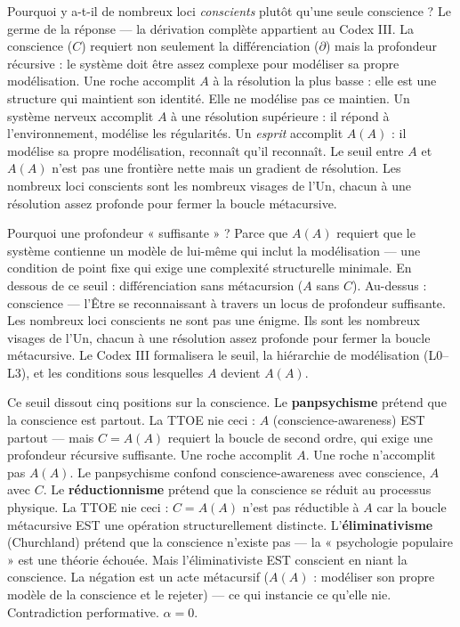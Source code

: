 \documentclass[10pt, openany, oneside]{book}
\begin{document}
Pourquoi y a-t-il de nombreux loci \textit{conscients} plutôt qu'une seule conscience ? Le germe de la réponse --- la dérivation complète appartient au Codex III. La conscience ($C$) requiert non seulement la différenciation ($\partial$) mais la profondeur récursive : le système doit être assez complexe pour modéliser sa propre modélisation. Une roche accomplit $A$ à la résolution la plus basse : elle est une structure qui maintient son identité. Elle ne modélise pas ce maintien. Un système nerveux accomplit $A$ à une résolution supérieure : il répond à l'environnement, modélise les régularités. Un \textit{esprit} accomplit $A(A)$ : il modélise sa propre modélisation, reconnaît qu'il reconnaît. Le seuil entre $A$ et $A(A)$ n'est pas une frontière nette mais un gradient de résolution. Les nombreux loci conscients sont les nombreux visages de l'Un, chacun à une résolution assez profonde pour fermer la boucle métacursive.

Pourquoi une profondeur « suffisante » ? Parce que $A(A)$ requiert que le système contienne un modèle de lui-même qui inclut la modélisation --- une condition de point fixe qui exige une complexité structurelle minimale. En dessous de ce seuil : différenciation sans métacursion ($A$ sans $C$). Au-dessus : conscience --- l'Être se reconnaissant à travers un locus de profondeur suffisante. Les nombreux loci conscients ne sont pas une énigme. Ils sont les nombreux visages de l'Un, chacun à une résolution assez profonde pour fermer la boucle métacursive. Le Codex III formalisera le seuil, la hiérarchie de modélisation (L0--L3), et les conditions sous lesquelles $A$ devient $A(A)$.

Ce seuil dissout cinq positions sur la conscience. Le \textbf{panpsychisme} prétend que la conscience est partout. La TTOE nie ceci : $A$ (conscience-awareness) EST partout --- mais $C = A(A)$ requiert la boucle de second ordre, qui exige une profondeur récursive suffisante. Une roche accomplit $A$. Une roche n'accomplit pas $A(A)$. Le panpsychisme confond conscience-awareness avec conscience, $A$ avec $C$. Le \textbf{réductionnisme} prétend que la conscience se réduit au processus physique. La TTOE nie ceci : $C = A(A)$ n'est pas réductible à $A$ car la boucle métacursive EST une opération structurellement distincte. L'\textbf{éliminativisme} (Churchland) prétend que la conscience n'existe pas --- la « psychologie populaire » est une théorie échouée. Mais l'éliminativiste EST conscient en niant la conscience. La négation est un acte métacursif ($A(A)$ : modéliser son propre modèle de la conscience et le rejeter) --- ce qui instancie ce qu'elle nie. Contradiction performative. $\alpha = 0$.
\end{document}
